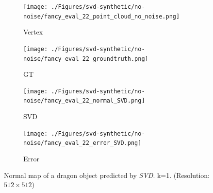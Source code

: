 \begin{figure}[th]
	\centering
	\captionsetup{width=\linewidth}
		\begin{subfigure}[b]{0.24\linewidth}
		\texttt{[image: ./Figures/svd-synthetic/no-noise/fancy\_eval\_22\_point\_cloud\_no\_noise.png]}
		\caption{Vertex}
	\end{subfigure}
	\begin{subfigure}[b]{0.24\linewidth}
		\texttt{[image: ./Figures/svd-synthetic/no-noise/fancy\_eval\_22\_groundtruth.png]}
		\caption{GT}
	\end{subfigure}
	\begin{subfigure}[b]{0.24\linewidth}
		\texttt{[image: ./Figures/svd-synthetic/no-noise/fancy\_eval\_22\_normal\_SVD.png]}
		\caption{SVD}
	\end{subfigure}
	\begin{subfigure}[b]{0.24\linewidth}
		\texttt{[image: ./Figures/svd-synthetic/no-noise/fancy\_eval\_22\_error\_SVD.png]}
		\caption{Error}
	\end{subfigure}
	
	\decoRule
	\caption{Normal map of a dragon object predicted by \textit{SVD}. k=1. (Resolution: $ 512\times 512 $) }
	\label{fig:svd-normal}
\end{figure}


